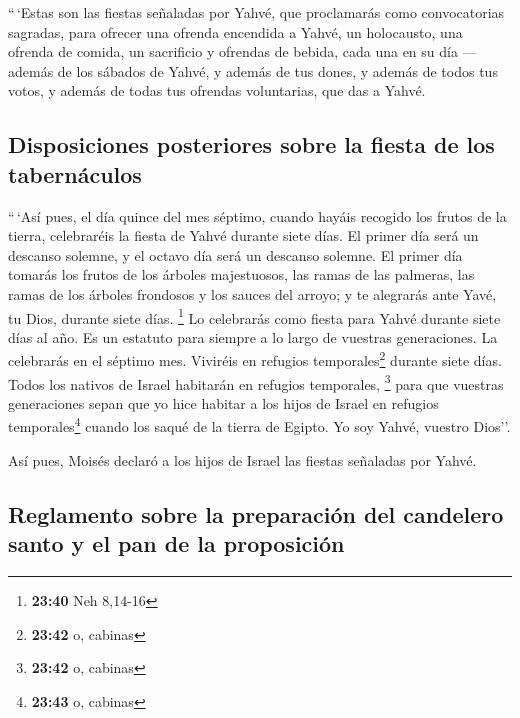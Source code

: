  ``\,`Estas son las fiestas señaladas por Yahvé, que
proclamarás como convocatorias sagradas, para ofrecer una ofrenda
encendida a Yahvé, un holocausto, una ofrenda de comida, un sacrificio y
ofrendas de bebida, cada una en su día ---  además de los
sábados de Yahvé, y además de tus dones, y además de todos tus votos, y
además de todas tus ofrendas voluntarias, que das a Yahvé.

\hypertarget{disposiciones-posteriores-sobre-la-fiesta-de-los-tabernuxe1culos}{%
\subsection{Disposiciones posteriores sobre la fiesta de los
tabernáculos}\label{disposiciones-posteriores-sobre-la-fiesta-de-los-tabernuxe1culos}}

 ``\,`Así pues, el día quince del mes séptimo, cuando
hayáis recogido los frutos de la tierra, celebraréis la fiesta de Yahvé
durante siete días. El primer día será un descanso solemne, y el octavo
día será un descanso solemne.  El primer día tomarás los
frutos de los árboles majestuosos, las ramas de las palmeras, las ramas
de los árboles frondosos y los sauces del arroyo; y te alegrarás ante
Yavé, tu Dios, durante siete días. \footnote{\textbf{23:40} Neh 8,14-16}
 Lo celebrarás como fiesta para Yahvé durante siete días
al año. Es un estatuto para siempre a lo largo de vuestras generaciones.
La celebrarás en el séptimo mes.  Viviréis en refugios
temporales\footnote{\textbf{23:42} o, cabinas} durante siete días. Todos
los nativos de Israel habitarán en refugios temporales, \footnote{\textbf{23:42}
  o, cabinas}  para que vuestras generaciones sepan que
yo hice habitar a los hijos de Israel en refugios temporales\footnote{\textbf{23:43}
  o, cabinas} cuando los saqué de la tierra de Egipto. Yo soy Yahvé,
vuestro Dios''.

 Así pues, Moisés declaró a los hijos de Israel las
fiestas señaladas por Yahvé.

\hypertarget{reglamento-sobre-la-preparaciuxf3n-del-candelero-santo-y-el-pan-de-la-proposiciuxf3n}{%
\subsection{Reglamento sobre la preparación del candelero santo y el pan
de la
proposición}\label{reglamento-sobre-la-preparaciuxf3n-del-candelero-santo-y-el-pan-de-la-proposiciuxf3n}}

